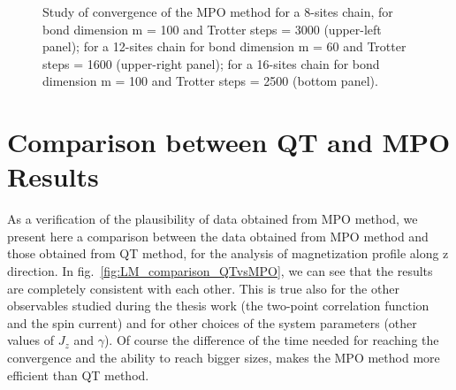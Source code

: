 \begin{figure}[H]
\captionsetup{width=1.\linewidth}
\caption{Study of convergence of the MPO method for a 8-sites chain, for bond dimension m = 100 and Trotter steps = 3000 (upper-left panel); for a 12-sites chain for bond dimension m = 60 and Trotter steps = 1600 (upper-right panel); for a 16-sites chain for bond dimension m = 100 and Trotter steps = 2500 (bottom panel).}
\label{fig:convergence_8_12_16}
\end{figure}


\section{Comparison between QT and MPO Results}
As a verification of the plausibility of data obtained from MPO method, we present here a comparison between the data obtained from MPO method and those obtained from QT method, for the analysis of magnetization profile along z direction. In fig.~\ref{fig:LM_comparison_QTvsMPO}, we can see that the results are completely consistent with each other. This is true also for the other observables studied during the thesis work (the two-point correlation function and the spin current) and for other choices of the system parameters (other values of $J_z$ and $\gamma$). Of course the difference of the time needed for reaching the convergence and the ability to reach bigger sizes, makes the MPO method more efficient than QT method.

